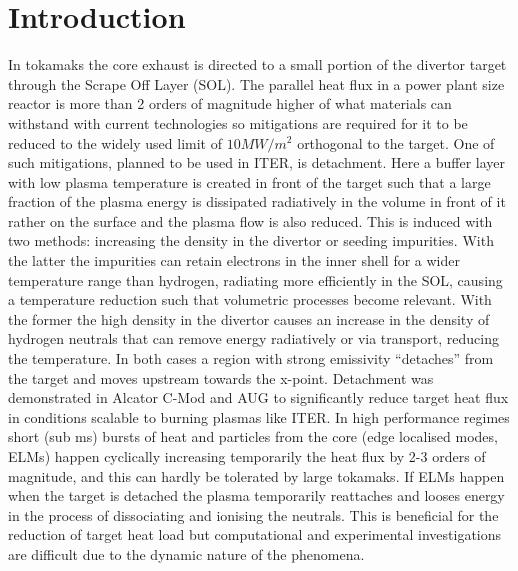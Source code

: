 

\section{Introduction}\label{introduction}

In tokamaks the core exhaust is directed to a small portion of the divertor target through the Scrape Off Layer (SOL). The parallel heat flux in a power plant size reactor is more than 2 orders of magnitude higher of what materials can withstand with current technologies so mitigations are required for it to be reduced to the widely used limit of $10MW/m^2$ orthogonal to the target. \cite{Pitts2019} One of such mitigations, planned to be used in ITER, is detachment. Here a buffer layer with low plasma temperature is created in front of the target such that a large fraction of the plasma energy is dissipated radiatively in the volume in front of it rather on the surface and the plasma flow is also reduced. This is induced with two methods: increasing the density in the divertor or seeding impurities. With the latter the impurities can retain electrons in the inner shell for a wider temperature range than hydrogen, radiating more efficiently in the SOL, causing a temperature reduction such that volumetric processes become relevant. With the former the high density in the divertor causes an increase in the density of hydrogen neutrals that can remove energy radiatively or via transport, reducing the temperature. \cite{Leonard2018} In both cases a region with strong emissivity “detaches” from the target and moves upstream towards the x-point. Detachment was demonstrated in Alcator C-Mod \cite{Lipschultz2007} and AUG \cite{Kallenbach2015a} to significantly reduce target heat flux in conditions scalable to burning plasmas like ITER.
In high performance regimes short (sub ms) bursts of heat and particles from the core (edge localised modes, ELMs) happen cyclically increasing temporarily the heat flux by 2-3 orders of magnitude, and this can hardly be tolerated by large tokamaks. \cite{Jachmich2011} If ELMs happen when the target is detached the plasma temporarily reattaches and looses energy in the process of dissociating and ionising the neutrals. This is beneficial for the reduction of target heat load but computational and experimental investigations are difficult due to the dynamic nature of the phenomena.

